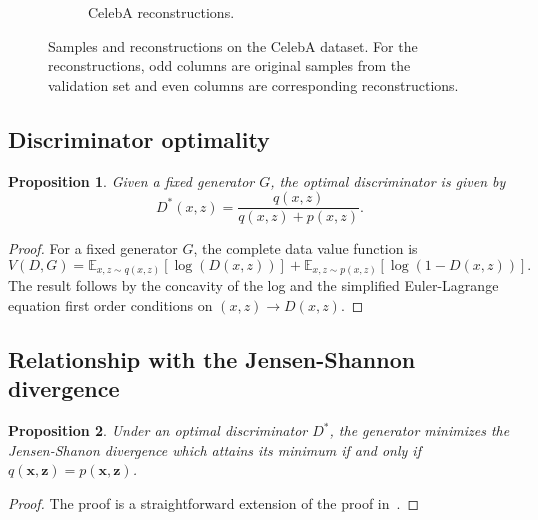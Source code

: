 \documentclass{article}
\newtheorem{prop}{Proposition}
\newcommand{\EE}{\mathbb{E}}
\begin{document}
\begin{figure}[p]
\begin{subfigure}[t]{0.49\textwidth}
        \caption{\label{fig:celeba_reconstructions} CelebA reconstructions.}
    \end{subfigure}
    \caption{\label{fig:celeba_images} Samples and reconstructions on the CelebA
        dataset. For the reconstructions, odd columns are
        original samples from the validation set and even columns are
        corresponding reconstructions.}
\end{figure}

\subsection{Discriminator optimality}
\label{sec:disc_opt}
\begin{prop}
    Given a fixed generator $G$, the optimal discriminator is given by
    \begin{equation}
    \label{eq:optgansol}
		D^*(x, z) = \frac{q(x, z)}{q(x, z) + p(x, z)}.
    \end{equation}
\end{prop}
\begin{proof}
	For a fixed generator $G$, the complete data value function is
	\begin{equation}
	\label{eq:cdganvalue}
		V(D, G) = \EE_{x,z \sim q(x,z)}[\log(D(x, z))]
		        + \EE_{x, z \sim p(x, z)}[\log(1 - D(x, z))].
	\end{equation}
	The result follows by the concavity of the log and the simplified
	Euler-Lagrange equation first order conditions on
	$(x, z) \rightarrow D(x, z)$.
\end{proof}

\subsection{Relationship with the Jensen-Shannon divergence}
\label{sec:jsd_rel}
\begin{prop}
	Under an optimal discriminator $D^{*}$, the generator minimizes the
	Jensen-Shanon divergence which attains its minimum if and only if
	$q(\bm{x}, \bm{z}) = p(\bm{x}, \bm{z})$.
\end{prop}
\begin{proof}
	The proof is a straightforward extension of the proof
	in~\cite{goodfellow2014generative}.
\end{proof}
\end{document}
